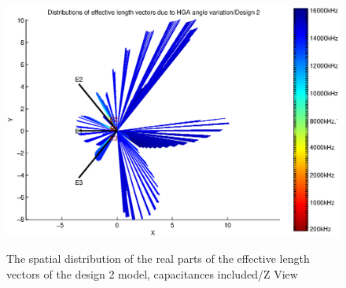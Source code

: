 \documentclass[a4paper,14pt]{extbook}
\begin{document}
\begin{figure}
\begin{center}
\includegraphics[width=12cm]{HeffVerteilungHGAD2-ZView_caps.eps} \\
\caption{The spatial distribution of the real parts of the effective length vectors of the design 2 model, capacitances included/Z View}\label{fig_heff_dist_HGA_D2_A_Z_View_caps}
\end{center}
\end{figure}
\end{document}
